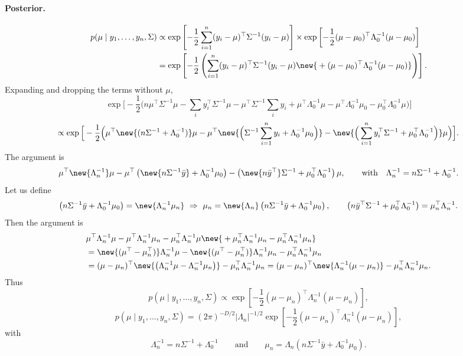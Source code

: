 \paragraph{Posterior.}
\begin{align*}
p(\mu \mid y_1, \dots, y_n, \Sigma) &\propto \exp\left[-\frac12\sum_{i=1}^{n}(y_i - \mu)^{\top}\Sigma^{-1}(y_i - \mu)\right]\times\exp\left[-\frac12(\mu - \mu_0)^{\top}\Lambda_0^{-1}(\mu - \mu_0)\right]\\
&= \exp\left[-\frac12\left(\sum_{i=1}^{n}(y_i - \mu)^{\top}\Sigma^{-1}(y_i - \mu) \new{{}+ (\mu - \mu_0)^{\top}\Lambda_0^{-1}(\mu - \mu_0)}\right)\right].
\end{align*}
Expanding and dropping the terms without $\mu$,
\[
\exp\Big[-\frac12\Big(n\mu^{\top}\Sigma^{-1}\mu - \sum_i y_i^{\top}\Sigma^{-1}\mu - \mu^{\top}\Sigma^{-1}\sum_i y_i + \mu^{\top}\Lambda_0^{-1}\mu - \mu^{\top}\Lambda_0^{-1}\mu_0 - \mu_0^{\top}\Lambda_0^{-1}\mu\Big)\Big]
\]
\[
\propto \exp\Big[-\frac12\Big(\mu^{\top}\new{(n\Sigma^{-1} + \Lambda_0^{-1})}\mu - \mu^{\top}\new{\Big(\Sigma^{-1}\sum_{i=1}^{n}y_i + \Lambda_0^{-1}\mu_0\Big)} - \new{\Big(\sum_{i=1}^{n}y_i^{\top}\Sigma^{-1} + \mu_0^{\top}\Lambda_0^{-1}\Big)}\mu\Big)\Big].
\]
The argument is
\[
\mu^{\top}\new{\Lambda_n^{-1}}\mu - \mu^{\top}\left(\new{n\Sigma^{-1}\bar{y}} + \Lambda_0^{-1}\mu_0\right) - \left(\new{n\bar{y}^{\top}}\Sigma^{-1} + \mu_0^{\top}\Lambda_0^{-1}\right)\mu,
\qquad\text{with}\quad \Lambda_n^{-1} = n\Sigma^{-1} + \Lambda_0^{-1}.
\]
Let us define
\[
\left(n\Sigma^{-1}\bar{y} + \Lambda_0^{-1}\mu_0\right) = \new{\Lambda_n^{-1}\mu_n}
\ \Rightarrow\
\mu_n = \new{\Lambda_n}\left(n\Sigma^{-1}\bar{y} + \Lambda_0^{-1}\mu_0\right),
\qquad
\left(n\bar{y}^{\top}\Sigma^{-1} + \mu_0^{\top}\Lambda_0^{-1}\right) = \mu_n^{\top}\Lambda_n^{-1}.
\]
Then the argument is
\begin{align*}
&\mu^{\top}\Lambda_n^{-1}\mu - \mu^{\top}\Lambda_n^{-1}\mu_n - \mu_n^{\top}\Lambda_n^{-1}\mu \new{{}+ \mu_n^{\top}\Lambda_n^{-1}\mu_n - \mu_n^{\top}\Lambda_n^{-1}\mu_n}\\
&= \new{(\mu^{\top} - \mu_n^{\top})}\Lambda_n^{-1}\mu - \new{(\mu^{\top} - \mu_n^{\top})}\Lambda_n^{-1}\mu_n - \mu_n^{\top}\Lambda_n^{-1}\mu_n\\
&= (\mu - \mu_n)^{\top}\new{\left(\Lambda_n^{-1}\mu - \Lambda_n^{-1}\mu_n\right)} - \mu_n^{\top}\Lambda_n^{-1}\mu_n
= (\mu - \mu_n)^{\top}\new{\Lambda_n^{-1}(\mu - \mu_n)} - \mu_n^{\top}\Lambda_n^{-1}\mu_n.
\end{align*}
Thus
\[
p(\mu \mid y_1, \dots, y_n, \Sigma) \propto \exp\left[-\frac12(\mu - \mu_n)^{\top}\Lambda_n^{-1}(\mu - \mu_n)\right],
\]
\[
p(\mu \mid y_1, \dots, y_n, \Sigma) = (2\pi)^{-D/2}|\Lambda_n|^{-1/2}\exp\left[-\frac12(\mu - \mu_n)^{\top}\Lambda_n^{-1}(\mu - \mu_n)\right],
\]
with
\[
\Lambda_n^{-1} = n\Sigma^{-1} + \Lambda_0^{-1}
\qquad\text{and}\qquad
\mu_n = \Lambda_n\left(n\Sigma^{-1}\bar{y} + \Lambda_0^{-1}\mu_0\right).
\]

